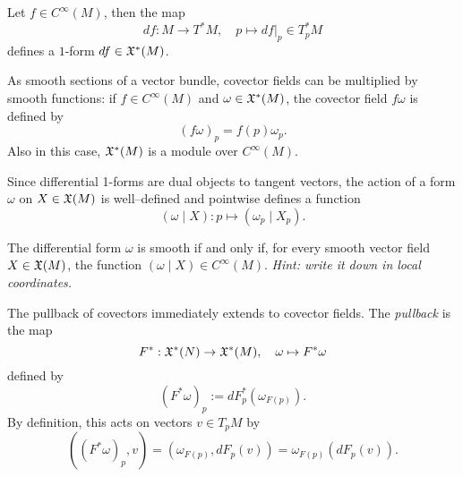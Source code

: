 \begin{example}
  Let $f\in C^\infty(M)$, then the map
  \begin{equation}
    df : M \to T^*M, \quad p \mapsto df|_p \in T^*_p M
  \end{equation}
  defines a $1$-form $df\in\mathfrak{X}^*(M)$.
\end{example}

As smooth sections of a vector bundle, covector fields can be multiplied by smooth functions: if $f\in C^\infty(M)$ and $\omega\in\mathfrak{X}^*(M)$, the covector field $f\omega$ is defined by
\begin{equation}
  (f\omega)_p = f(p)\omega_p.
\end{equation}
Also in this case, $\mathfrak{X}^*(M)$ is a module over $C^\infty(M)$.

Since differential 1-forms are dual objects to tangent vectors, the action of a form $\omega$ on $X\in\mathfrak{X}(M)$ is well--defined and pointwise defines a function
\begin{equation}
  (\omega \mid X) : p \mapsto (\omega_p \mid X_p).
\end{equation}

\begin{exercise}
The differential form $\omega$ is smooth if and only if, for every smooth vector field $X\in\mathfrak{X}(M)$, the function $(\omega \mid X)\in C^\infty(M)$.
\textit{\small Hint: write it down in local coordinates.}
\end{exercise}

\begin{definition}\label{def:pullback1f}
  The pullback of covectors immediately extends to covector fields.
  The \emph{pullback} is the map
  \begin{equation}
    F^*: \mathfrak{X}^*(N) \to \mathfrak{X}^*(M), \quad \omega \mapsto F^* \omega
  \end{equation} 
  defined by
  \begin{equation}
    (F^*\omega)_p := dF_p^*(\omega_{F(p)}).
  \end{equation}
  By definition, this acts on vectors $v\in T_p M$ by
  \begin{equation}
    ((F^*\omega)_p, v) = (\omega_{F(p)}, dF_p(v)) = \omega_{F(p)}(dF_p(v)).
  \end{equation}
\end{definition}

